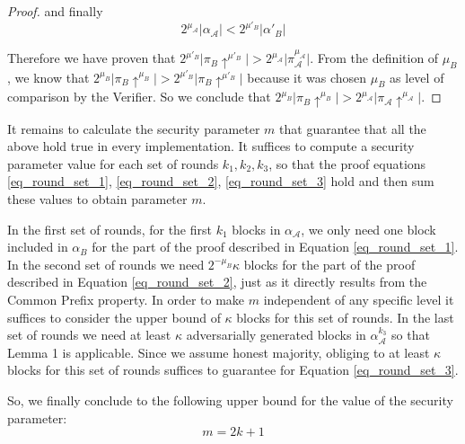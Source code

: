 \begin{proof}
	and finally
	\begin{equation}
	2^{\mu_\mathcal{A}} \vert \alpha_\mathcal{A} \vert < 2^{\mu'_B} \vert \alpha'{_B} \vert
	\end{equation}


	Therefore we have proven that $2^{\mu'_B} \vert \pi_B \uparrow^{\mu'_B} \vert >
	2^{\mu_\mathcal{A}} \vert \pi_\mathcal{A}^{\mu_\mathcal{A}} \vert$. From the definition of $\mu_B$, we know
	that $2^{\mu_B} \vert \pi_B \uparrow^{\mu_B} \vert > 2^{\mu'_B} \vert \pi_B
	\uparrow^{\mu'_B} \vert$ because it was chosen $\mu_B$ as level of comparison
	by the Verifier. So we conclude that $2^{\mu_B} \vert \pi_B \uparrow^{\mu_B}
	\vert > 2^{\mu_\mathcal{A}} \vert \pi_\mathcal{A} \uparrow^{\mu_\mathcal{A}} \vert$.

\end{proof}

It remains to calculate the security parameter $m$ that guarantee that all the above
hold true in every implementation. It suffices to compute a security parameter
value for each set of rounds $k_1, k_2, k_3$, so that the proof equations
\ref{eq_round_set_1}, \ref{eq_round_set_2}, \ref{eq_round_set_3} hold and
then sum these values to obtain parameter $m$.

In the first set of rounds, for the first $k_1$ blocks in $\alpha_\mathcal{A}$, we only need
one block included in $\alpha_B$ for the part of the proof described in Equation
\ref{eq_round_set_1}. In the second set of rounds we need $2^{-\mu_B}\kappa$ blocks
for the part of the proof described in Equation \ref{eq_round_set_2}, just as it
directly results from the Common Prefix property. In order to make $m$ independent
of any specific level it suffices to consider the upper bound of $\kappa$ blocks
for this set of rounds. In the last set of rounds we need at least $\kappa$
adversarially generated blocks in $\alpha_\mathcal{A}^{k_3}$ so that Lemma 1 is applicable.
Since we assume honest majority, obliging to at least $\kappa$ blocks for this
set of rounds suffices to guarantee for Equation \ref{eq_round_set_3}.

So, we finally conclude to the following upper bound for the value of the
security parameter:
\begin{equation}
	m = 2k + 1
\end{equation}